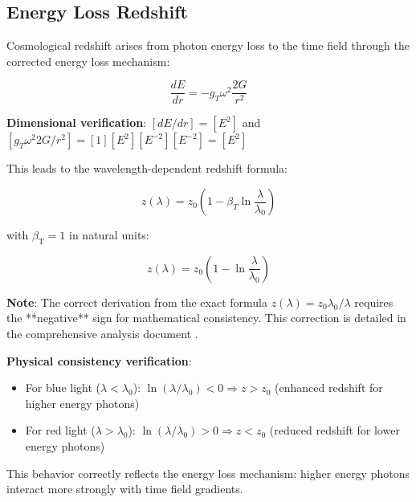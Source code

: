 \documentclass[12pt,a4paper]{article}
\newcommand{\betaT}{\beta_{\text{T}}}
\theoremstyle{definition}
\theoremstyle{remark}
\begin{document}
	\subsection{Energy Loss Redshift}
	\label{subsec:energy_loss_redshift}
	
	Cosmological redshift arises from photon energy loss to the time field through the corrected energy loss mechanism:
	
	\begin{equation}
		\frac{dE}{dr} = -g_T \omega^2 \frac{2G}{r^2}
		\label{eq:energy_loss_rate}
	\end{equation}
	
	\textbf{Dimensional verification}: $[dE/dr] = [E^2]$ and $[g_T \omega^2 2G/r^2] = [1][E^2][E^{-2}][E^{-2}] = [E^2]$ \checkmark
	
	This leads to the wavelength-dependent redshift formula:
	
	\begin{equation}
		\boxed{z(\lambda) = z_0\left(1 - \beta_T \ln\frac{\lambda}{\lambda_0}\right)}
		\label{eq:corrected_wavelength_dependent_redshift}
	\end{equation}
	
	with $\betaT = 1$ in natural units:
	
	\begin{equation}
		\boxed{z(\lambda) = z_0\left(1 - \ln\frac{\lambda}{\lambda_0}\right)}
		\label{eq:corrected_redshift_natural_units}
	\end{equation}
	
	\textbf{Note}: The correct derivation from the exact formula $z(\lambda) = z_0 \lambda_0/\lambda$ requires the **negative** sign for mathematical consistency. This correction is detailed in the comprehensive analysis document \cite{pascher_derivation_beta_2025}.
	
	\textbf{Physical consistency verification}:
	\begin{itemize}
		\item For blue light ($\lambda < \lambda_0$): $\ln(\lambda/\lambda_0) < 0 \Rightarrow z > z_0$ (enhanced redshift for higher energy photons)
		\item For red light ($\lambda > \lambda_0$): $\ln(\lambda/\lambda_0) > 0 \Rightarrow z < z_0$ (reduced redshift for lower energy photons)
	\end{itemize}
	
	This behavior correctly reflects the energy loss mechanism: higher energy photons interact more strongly with time field gradients.
	
\end{document}
